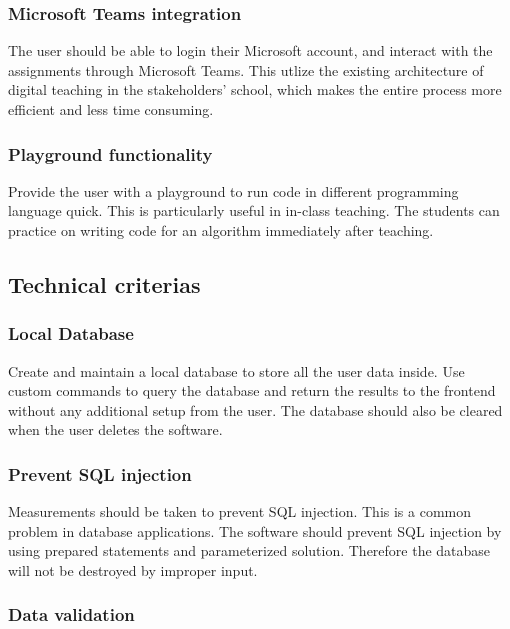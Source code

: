 \documentclass[a4paper]{report}
\begin{document}
\subsubsection{Microsoft Teams integration}

The user should be able to login their Microsoft account, and interact with the assignments through Microsoft Teams. This utlize the existing architecture of digital teaching in the stakeholders' school, which makes the entire process more efficient and less time consuming.

\subsubsection{Playground functionality}

Provide the user with a playground to run code in different programming language quick. This is particularly useful in in-class teaching. The students can practice on writing code for an algorithm immediately after teaching.

\subsection{Technical criterias}

\subsubsection{Local Database}

Create and maintain a local database to store all the user data inside. Use custom commands to query the database and return the results to the frontend without any additional setup from the user. The database should also be cleared when the user deletes the software.

\subsubsection{Prevent SQL injection}

Measurements should be taken to prevent SQL injection. This is a common problem in database applications. The software should prevent SQL injection by using prepared statements and parameterized solution. Therefore the database will not be destroyed by improper input.

\subsubsection{Data validation}
\end{document}
